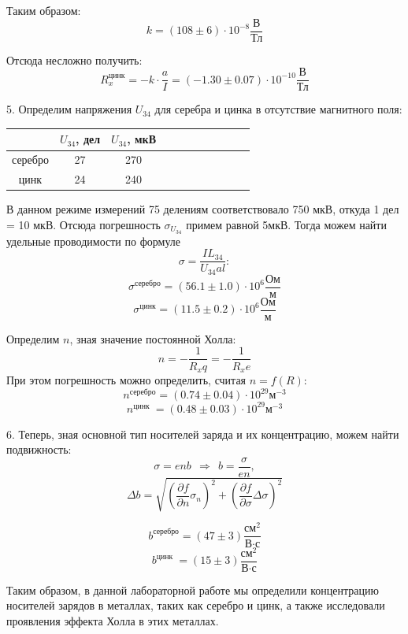 \documentclass[14pt]{article}
\begin{document}
Таким образом:
$$
	k = (108 \pm 6)\cdot 10^{-8} \frac{\text{В}}{\text{Тл}}
$$
	
Отсюда несложно получить:
$$
	\boxed{R_x^{\text{цинк}} = - k\cdot\frac{a}{I} = (-1.30 \pm 0.07) \cdot 10^{-10} \frac{\text{В}}{\text{Тл}}}
$$

\vspace{1cm}
5. Определим напряжения $U_{34}$ для серебра и цинка в отсутствие магнитного поля:

\begin{center}
\begin{tabular}{|c|c|c|c|c|c|c|c|c|c|c|}
\hline
			&	$U_{34}$, дел	&	$U_{34}$, мкВ	\\
\hline
серебро		&	27				&	270				\\
\hline
цинк		&	24				&	240 			\\
\hline
\end{tabular}
\end{center}

В данном режиме измерений 75 делениям соответствовало 750 мкВ, откуда 1 дел = 10 мкВ. Отсюда погрешность $\sigma_{U_{34}}$ примем равной 5мкВ. Тогда можем найти удельные проводимости по формуле
$$
	\sigma = \frac{IL_{34}}{U_{34}al}:
$$
$$
	\sigma^\text{серебро} = (56.1 \pm 1.0)\cdot 10^{6} \frac{\text{Ом}}{\text{м}}
$$
$$
	\sigma^\text{цинк} = (11.5 \pm 0.2)\cdot 10^{6} \frac{\text{Ом}}{\text{м}}
$$

Определим $n$, зная значение постоянной Холла:
$$	
	n = -\frac{1}{R_xq} = -\frac{1}{R_xe}
$$
\noindent При этом погрешность можно определить, считая $n = f(R)$:
$$
	n^{\text{серебро}} = (0.74 \pm 0.04) \cdot 10^{29} \text{м}^{-3}
$$
$$
	n^{\text{цинк   }} = (0.48 \pm 0.03) \cdot 10^{29} \text{м}^{-3}
$$

\vspace{1cm}
6. Теперь, зная основной тип носителей заряда и их концентрацию, можем найти подвижность:
$$
	\sigma = enb ~~\Rightarrow ~~b = \frac{\sigma}{en},
$$
$$
	\Delta b = \sqrt{\left(\frac{\partial f}{\partial n}\sigma_n\right)^2 + \left(\frac{\partial f}{\partial\sigma}\Delta\sigma\right)^2}
$$

$$
	b^{\text{серебро}} = (47 \pm 3) \frac{\text{см}^2}{\text{В}\cdot\text{с}}
$$
$$
	b^{\text{цинк   }} = (15 \pm 3) \frac{\text{см}^2}{\text{В}\cdot\text{с}}
$$

\vspace{1cm}
Таким образом, в данной лабораторной работе мы определили концентрацию носителей зарядов в металлах, таких как серебро и цинк, а также исследовали проявления эффекта Холла в этих металлах. 
\end{document}
